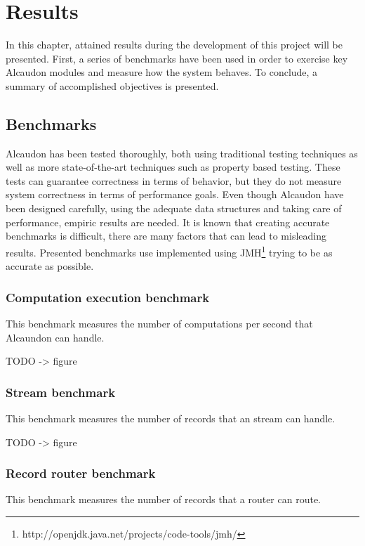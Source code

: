 \chapter{Results}

In this chapter, attained results during the development of this project will be
presented. First, a series of benchmarks have been used in order to
exercise key Alcaudon modules and measure how the system behaves. To conclude,
a summary of accomplished objectives is presented.

\section{Benchmarks}

Alcaudon has been tested thoroughly, both using traditional testing techniques
as well as more state-of-the-art techniques such as property based testing.
These tests can guarantee correctness in terms of behavior, but they do not
measure system correctness in terms of performance goals. Even though Alcaudon
have been designed carefully, using the adequate data structures and taking
care of performance, empiric results are needed. It is known that creating
accurate benchmarks is difficult\cite{benchbias}, there are many factors
that can lead to misleading results. Presented benchmarks use implemented using
JMH\footnote{http://openjdk.java.net/projects/code-tools/jmh/} trying to be as
accurate as possible.

\subsection{Computation execution benchmark}

This benchmark measures the number of computations per second that Alcaundon can
handle.

TODO -> figure

\subsection{Stream benchmark}

This benchmark measures the number of records that an stream can handle.

TODO -> figure

\subsection{Record router benchmark}

This benchmark measures the number of records that a router can route.

